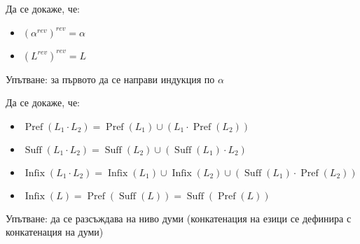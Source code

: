 \begin{problem}
Да се докаже, че:
\begin{itemize}
    \item $(\alpha^{rev})^{rev} = \alpha$
    \item $(L^{rev})^{rev} = L$
\end{itemize}

Упътване: за първото да се направи индукция по $\alpha$
\end{problem}
\begin{problem}
Да се докаже, че:
\begin{itemize}
    \item $\operatorname{Pref}(L_1 \cdot L_2) = \operatorname{Pref}(L_1) \cup (L_1 \cdot \operatorname{Pref}(L_2))$
    \item $\operatorname{Suff}(L_1 \cdot L_2) = \operatorname{Suff}(L_2) \cup (\operatorname{Suff}(L_1) \cdot L_2)$
    \item $\operatorname{Infix}(L_1 \cdot L_2) = \operatorname{Infix}(L_1) \cup \operatorname{Infix}(L_2) \cup (\operatorname{Suff}(L_1) \cdot \operatorname{Pref}(L_2))$
    \item $\operatorname{Infix}(L) = \operatorname{Pref}(\operatorname{Suff}(L)) = \operatorname{Suff}(\operatorname{Pref}(L))$
\end{itemize}

Упътване: да се разсъждава на ниво думи (конкатенация на езици се дефинира с конкатенация на думи)
\end{problem}